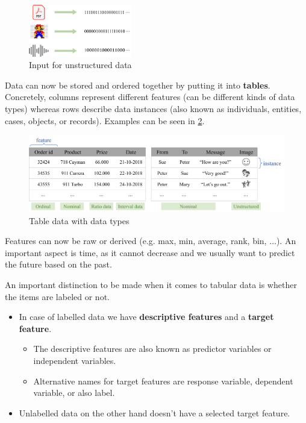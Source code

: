 \begin{figure}[H]
  \centering
  \includegraphics[width=0.4\textwidth]{assets/basics/unstructured_data.png}
  \caption{Input for unstructured data}
  \label{fig:1_unstructured_data}
\end{figure}

Data can now be stored and ordered together by putting it into \textbf{tables}. Concretely, columns represent different features (can be different kinds of data types) whereas rows describe data instances (also known as individuals, entities, cases, objects, or records). Examples can be seen in \ref{fig:1_table_data}.

\begin{figure}[H]
  \centering
  \includegraphics[width=\textwidth]{assets/basics/table_data.png}
  \caption{Table data with data types}
  \label{fig:1_table_data}
\end{figure}

Features  can now be raw or derived (e.g. max, min, average, rank, bin, $\dots$). An important aspect is time, as it cannot decrease and we usually want to predict the future based on the past. 

An important distinction to be made when it comes to tabular data is whether the items are labeled or not.
\begin{itemize}
  \item {}In case of labelled data we have \textbf{descriptive features} and a \textbf{target feature}.
  \begin{itemize}
    \item The descriptive features are also known as predictor variables or independent variables.
    \item Alternative names for target features are response variable, dependent variable, or also label.
  \end{itemize}
  \item {}Unlabelled data on the other hand doesn't have a selected target feature.
\end{itemize}